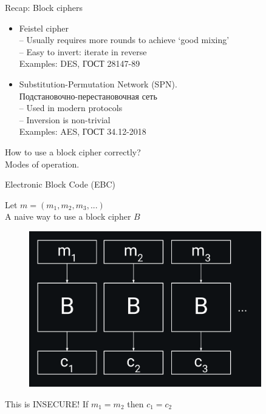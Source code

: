 \documentclass[usenames,dvipsnames, 9pt]{beamer}
\begin{document}
\begin{frame}{Recap: Block ciphers}

\begin{itemize}
	\itemsep 2em
	\LARGE
	\item Feistel cipher \\
	 -- Usually requires more rounds to achieve `good mixing' \\[5pt]
	-- Easy to invert: iterate in reverse  \\[5pt]
	\Large
	Examples: DES, ГОСТ 28147-89
	\LARGE
	\item Substitution-Permutation Network (SPN). \\ Подстановочно-перестановочная сеть  \\[5pt]
	-- Used in modern protocols  \\[5pt]
	-- Inversion is non-trivial \\[5pt]
	\Large
	Examples: AES, ГОСТ 34.12-2018
	
\end{itemize}
\end{frame}

\begin{frame}
	\Huge
	\centering
	{\color{Orange}How to use a block cipher correctly?} \\[10pt]
	
	Modes of operation.
	
\end{frame}

\begin{frame}{Electronic Block Code (EBC)}

\Large
Let $m = (m_1, m_2, m_3, ...)$ \\
A naive way to use a block cipher $B$
\begin{figure}
			\includegraphics[width=0.9\textwidth]{EBC}
	\end{figure}
\LARGE
This is {\color{Orange} INSECURE!} \quad
If $m_1 = m_2$ then $c_1 = c_2$

\end{frame}
\end{document}
